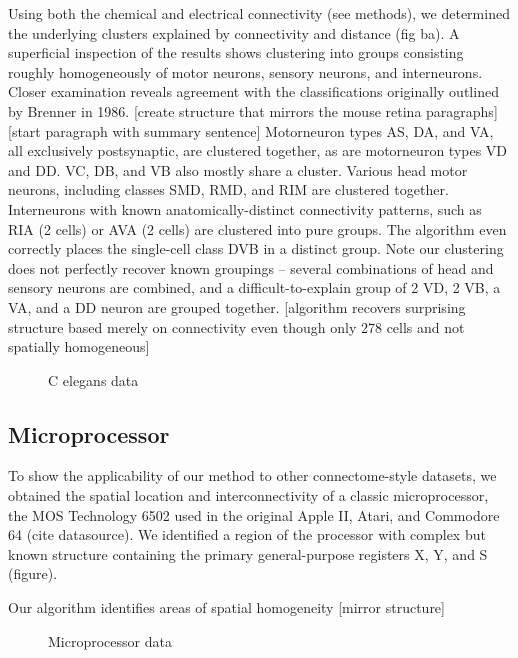 \documentclass{article}
\begin{document}
Using both the chemical and electrical connectivity (see methods), we determined the underlying clusters explained by connectivity and distance (fig ba). A superficial inspection of the results shows clustering into groups consisting roughly homogeneously of motor neurons, sensory neurons, and interneurons. Closer examination reveals agreement with the classifications originally outlined by Brenner in 1986. 
[create structure that mirrors the mouse retina paragraphs] 
[start paragraph with summary sentence] Motorneuron types AS, DA, and VA, all exclusively postsynaptic, are clustered together, as are motorneuron types VD and DD. VC, DB, and VB also mostly share a cluster. Various head motor neurons, including classes SMD, RMD, and RIM are clustered together. Interneurons with known anatomically-distinct connectivity patterns, such as RIA (2 cells) or AVA (2 cells) are clustered into pure groups. The algorithm even correctly places the single-cell class DVB in a distinct group. Note our clustering does not perfectly recover known groupings -- several combinations of head and sensory neurons are combined, and a difficult-to-explain group of 2 VD, 2 VB, a VA, and a DD neuron are grouped together. [algorithm recovers surprising structure based merely on connectivity even though only 278 cells and not spatially homogeneous] 








\begin{figure}
  \centering 
  \caption{C elegans data}
\end{figure}

\subsection{Microprocessor}
To show the applicability of our method to other connectome-style datasets, we obtained the spatial location and interconnectivity of a classic microprocessor, the MOS Technology 6502 used in the original Apple II, Atari, and Commodore 64 (cite datasource). We identified a region of the processor with complex but known structure containing the primary general-purpose registers X, Y, and S (figure). 

Our algorithm identifies areas of spatial homogeneity 
[mirror structure] 


\begin{figure}
  \centering 
  \caption{Microprocessor data}
\end{figure}
\end{document}
